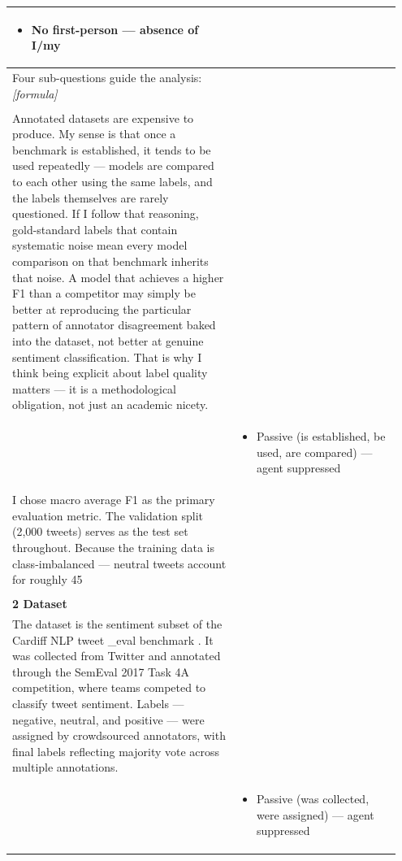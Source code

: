 \documentclass[11pt]{article}
\begin{document}
\begin{longtable}{|p{0.55\linewidth}|p{0.40\linewidth}|}
\begin{itemize}[leftmargin=1em,itemsep=1pt,topsep=1pt,parsep=0pt]
  \item No first-person --- absence of I/my
\end{itemize} \\
\hline
Four sub-questions guide the analysis: \textit{[formula]} & \\[2pt]
\hline
\rule[-3.5cm]{0pt}{3.5cm} &  \\
\hline
Annotated datasets are expensive to produce. My sense is that once a benchmark is established, it tends to be used repeatedly --- models are compared to each other using the same labels, and the labels themselves are rarely questioned. If I follow that reasoning, gold-standard labels that contain systematic noise mean every model comparison on that benchmark inherits that noise. A model that achieves a higher F1 than a competitor may simply be better at reproducing the particular pattern of annotator disagreement baked into the dataset, not better at genuine sentiment classification. That is why I think being explicit about label quality matters --- it is a methodological obligation, not just an academic nicety. & \\[2pt]
\hline
\rule[-3.5cm]{0pt}{3.5cm} & \begin{itemize}[leftmargin=1em,itemsep=1pt,topsep=1pt,parsep=0pt]
  \item Passive (is established, be used, are compared) --- agent suppressed
\end{itemize} \\
\hline
I chose macro average F1 as the primary evaluation metric. The validation split (2,000 tweets) serves as the test set throughout. Because the training data is class-imbalanced --- neutral tweets account for roughly 45 & \\[2pt]
\hline
\rule[-3.5cm]{0pt}{3.5cm} &  \\
\hline
\textbf{2 Dataset}\\[4pt]
The dataset is the sentiment subset of the Cardiff NLP tweet \_eval benchmark . It was collected from Twitter and annotated through the SemEval 2017 Task 4A competition, where teams competed to classify tweet sentiment. Labels --- negative, neutral, and positive --- were assigned by crowdsourced annotators, with final labels reflecting majority vote across multiple annotations. & \\[2pt]
\hline
\rule[-3.5cm]{0pt}{3.5cm} & \begin{itemize}[leftmargin=1em,itemsep=1pt,topsep=1pt,parsep=0pt]
  \item Passive (was collected, were assigned) --- agent suppressed

\end{itemize}
\end{longtable}
\end{document}
